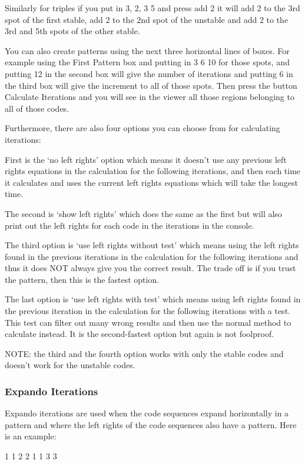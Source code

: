\documentclass[11pt]{report}
\begin{document}
Similarly for triples if you put in 3, 2, 3 5 and press add 2 it will add 2 to the 3rd spot of the first
stable, add 2 to the 2nd spot of the unstable and add 2 to the 3rd and 5th spots of the other stable.

You can also create patterns using the next three horizontal lines of boxes. For example using the First
Pattern box and putting in 3 6 10 for those spots, and putting 12 in the second box will give the number of
iterations and putting 6 in the third box will give the increment to all of those spots. Then press the button
Calculate Iterations and you will see in the viewer all those regions belonging to all of those codes.

Furthermore, there are also four options you can choose from for calculating iterations:

First is the ‘no left rights’ option which means it doesn't use any previous left rights equations in the
calculation for the following iterations, and then each time it calculates and uses the current left rights
equations which will take the longest time.

The second is ‘show left rights' which does the same as the first but will also print out the left rights for
each code in the iterations in the console.

The third option is ‘use left rights without test’ which means using the left rights found in the previous
iterations in the calculation for the following iterations and thus it does NOT always give you the correct
result. The trade off is if you trust the pattern, then this is the fastest option.

The last option is ‘use left rights with test’ which means using left rights found in the previous iteration in
the calculation for the following iterations with a test. This test can filter out many wrong results and then
use the normal method to calculate instead. It is the second-fastest option but again is not foolproof.

NOTE: the third and the fourth option works with only the stable codes and doesn't work for the unstable
codes.
\subsubsection{Expando Iterations}
Expando iterations are used when the code sequences expand horizontally in a pattern and where the left
rights of the code sequences also have a pattern. Here is an example:

1 1 2 2 1 1 3 3
\end{document}
